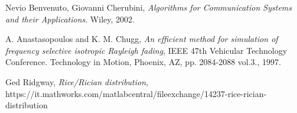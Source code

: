 \documentclass[a4paper,11.5pt]{article}
\begin{document}
\begin{thebibliography}{15}
	
	Nevio Benvenuto, Giovanni Cherubini,
	\textit{Algorithms for Communication Systems and their Applications}. 
	Wiley, 2002.
	
	A. Anastasopoulos and K. M. Chugg, 
	\textit{An efficient method for simulation of frequency selective isotropic Rayleigh fading},
	IEEE 47th Vehicular Technology Conference. Technology in Motion, Phoenix, AZ, pp. 2084-2088 vol.3., 1997.
	
	Ged Ridgway,
	\textit{Rice/Rician distribution,}\\
	https://it.mathworks.com/matlabcentral/fileexchange/14237-rice-rician-distribution
	
	
\end{thebibliography}
\end{document}
